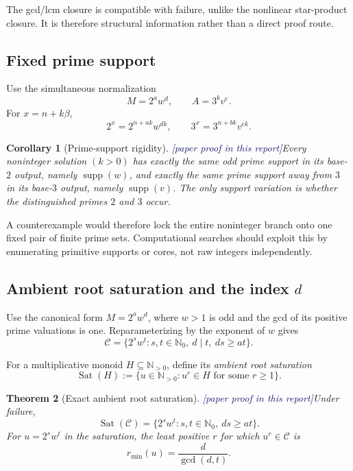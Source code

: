 \documentclass[11pt,oneside]{article}
\newtheorem{theorem}{Theorem}[section]
\newtheorem{corollary}[theorem]{Corollary}
\theoremstyle{definition}
\newcommand{\N}{\mathbb N}
\newcommand{\Nzero}{\mathbb N_0}
\newcommand{\Cand}{\mathcal C}
\newcommand{\Sat}{\operatorname{Sat}}
\newcommand{\supp}{\operatorname{supp}}
\newcommand{\tagPaper}{\textcolor{MidnightBlue}{\textsf{[paper proof in this report]}}}
\begin{document}
The gcd/lcm closure is compatible with failure, unlike the nonlinear star-product closure.
It is therefore structural information rather than a direct proof route.

\subsection{Fixed prime support}

Use the simultaneous normalization
\[
  M=2^aw^d,
  \qquad A=3^bv^e.
\]
For \(x=n+k\beta\),
\[
  2^x=2^{n+ak}w^{dk},
  \qquad
  3^x=3^{n+bk}v^{ek}.
\]

\begin{corollary}[Prime-support rigidity]\label{cor:prime-support}
\tagPaper Every noninteger solution \((k>0)\) has exactly the same odd prime support in
its base-\(2\) output, namely \(\supp(w)\), and exactly the same prime support away from
\(3\) in its base-\(3\) output, namely \(\supp(v)\).  The only support variation is
whether the distinguished primes \(2\) and \(3\) occur.
\end{corollary}

A counterexample would therefore lock the entire noninteger branch onto one fixed pair of
finite prime sets.  Computational searches should exploit this by enumerating primitive
supports or cores, not raw integers independently.

\subsection{Ambient root saturation and the index \texorpdfstring{\(d\)}{d}}

Use the canonical form \(M=2^aw^d\), where \(w>1\) is odd and the gcd of its positive
prime valuations is one.  Reparameterizing by the exponent of \(w\) gives
\begin{equation}\label{eq:candidate-cone}
  \Cand
  =\{2^sw^t:s,t\in\Nzero,\ d\mid t,\ ds\ge at\}.
\end{equation}

For a multiplicative monoid \(H\subseteq\N_{>0}\), define its \emph{ambient root
saturation}
\[
  \Sat(H):=\{u\in\N_{>0}:u^r\in H\text{ for some }r\ge1\}.
\]

\begin{theorem}[Exact ambient root saturation]\label{thm:root-saturation}
\tagPaper Under failure,
\[
  \boxed{\quad
  \Sat(\Cand)=\{2^sw^t:s,t\in\Nzero,\ ds\ge at\}.
  \quad}
\]
For \(u=2^sw^t\) in the saturation, the least positive \(r\) for which
\(u^r\in\Cand\) is
\[
  \boxed{\quad r_{\min}(u)=\frac d{\gcd(d,t)}.\quad}
\]
\end{theorem}
\end{document}
